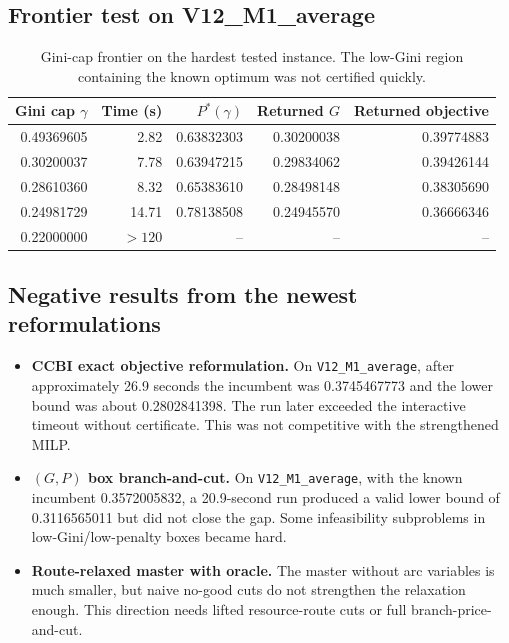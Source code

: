 \documentclass[11pt]{article}
\begin{document}
\subsection{Frontier test on V12\_M1\_average}

\begin{table}[h]
\centering
\begin{tabular}{rrrrr}
\toprule
Gini cap $\gamma$ & Time (s) & $P^*(\gamma)$ & Returned $G$ & Returned objective \\
\midrule
0.49369605 & 2.82 & 0.63832303 & 0.30200038 & 0.39774883 \\
0.30200037 & 7.78 & 0.63947215 & 0.29834062 & 0.39426144 \\
0.28610360 & 8.32 & 0.65383610 & 0.28498148 & 0.38305690 \\
0.24981729 & 14.71 & 0.78138508 & 0.24945570 & 0.36666346 \\
0.22000000 & $>120$ & -- & -- & -- \\
\bottomrule
\end{tabular}
\caption{Gini-cap frontier on the hardest tested instance.  The low-Gini region containing the known optimum was not certified quickly.}
\end{table}

\subsection{Negative results from the newest reformulations}

\begin{itemize}[leftmargin=*]
    \item \textbf{CCBI exact objective reformulation.} On \texttt{V12\_M1\_average}, after approximately 26.9 seconds the incumbent was 0.3745467773 and the lower bound was about 0.2802841398.  The run later exceeded the interactive timeout without certificate.  This was not competitive with the strengthened MILP.
    \item \textbf{$(G,P)$ box branch-and-cut.} On \texttt{V12\_M1\_average}, with the known incumbent 0.3572005832, a 20.9-second run produced a valid lower bound of 0.3116565011 but did not close the gap.  Some infeasibility subproblems in low-Gini/low-penalty boxes became hard.
    \item \textbf{Route-relaxed master with oracle.} The master without arc variables is much smaller, but naive no-good cuts do not strengthen the relaxation enough.  This direction needs lifted resource-route cuts or full branch-price-and-cut.
\end{itemize}
\end{document}
